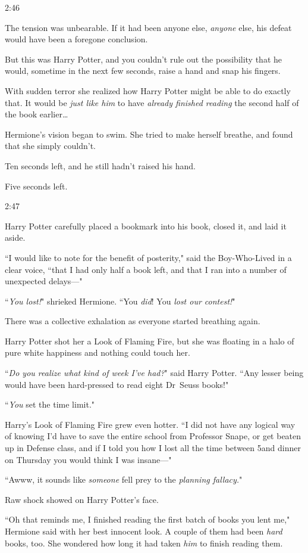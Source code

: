 2:46\pm

The tension was unbearable. If it had been anyone else, \emph{anyone} else, his defeat would have been a foregone conclusion.

But this was Harry Potter, and you couldn't rule out the possibility that he would, sometime in the next few seconds, raise a hand and snap his fingers.

With sudden terror she realized how Harry Potter might be able to do exactly that. It would be \emph{just like him} to have \emph{already finished reading} the second half of the book earlier{\ldots}

Hermione's vision began to swim. She tried to make herself breathe, and found that she simply couldn't.

Ten seconds left, and he still hadn't raised his hand.

Five seconds left.

2:47\pm

Harry Potter carefully placed a bookmark into his book, closed it, and laid it aside.

``I would like to note for the benefit of posterity," said the Boy-Who-Lived in a clear voice, ``that I had only half a book left, and that I ran into a number of unexpected delays---"

``\emph{You lost!}" shrieked Hermione. ``You \emph{did}! You \emph{lost our contest!}"

There was a collective exhalation as everyone started breathing again.

Harry Potter shot her a Look of Flaming Fire, but she was floating in a halo of pure white happiness and nothing could touch her.

``\emph{Do you realize what kind of week I've had?}" said Harry Potter. ``Any lesser being would have been hard-pressed to read eight Dr~Seuss books!"

``\emph{You} set the time limit."

Harry's Look of Flaming Fire grew even hotter. ``I did not have any logical way of knowing I'd have to save the entire school from Professor Snape, or get beaten up in Defense class, and if I told you how I lost all the time between 5\pm and dinner on Thursday you would think I was insane---"

``Awww, it sounds like \emph{someone} fell prey to the \emph{planning fallacy.}"

Raw shock showed on Harry Potter's face.

``Oh that reminds me, I finished reading the first batch of books you lent me," Hermione said with her best innocent look. A couple of them had been \emph{hard} books, too. She wondered how long it had taken \emph{him} to finish reading them.

